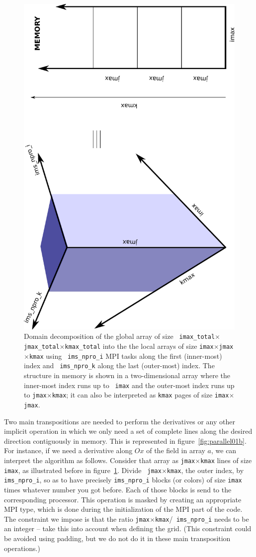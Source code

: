 \begin{figure}[!ht]
\begin{centering}
\includegraphics[height=0.8\textwidth,angle=270]{figs/parallel01a}
\caption{Domain decomposition of the global array of size {\tt
    imax\_total}$\times${\tt jmax\_total}$\times${\tt kmax\_total} into the the
  local arrays of size {\tt imax}$\times${\tt jmax}$\times${\tt kmax} using {\tt
  ims\_npro\_i} MPI tasks along the first (inner-most) index and {\tt
  ims\_npro\_k} along the last (outer-most) index. The structure in memory is
  shown in a two-dimensional array where the inner-most index runs up to {\tt
  imax} and the outer-most index runs up to {\tt jmax}$\times${\tt kmax}; it can
  also be interpreted as {\tt kmax} pages of size {\tt imax}$\times${\tt jmax}.}
\label{fig:parallel01a}
\end{centering}
\end{figure}

Two main transpositions are needed to perform the derivatives or any other
implicit operation in which we only need a set of complete lines along the
desired direction contiguously in memory. This is represented in
figure~\ref{fig:parallel01b}. For instance, if we need a derivative along $Ox$
of the field in array $a$, we can interpret the algorithm as follows. Consider
that array as {\tt jmax}$\times${\tt kmax} lines of size {\tt imax}, as
illustrated before in figure~\ref{fig:parallel01a}. Divide {\tt
jmax}$\times${\tt kmax}, the outer index, by {\tt ims\_npro\_i}, so as to have
precisely {\tt ims\_npro\_i} blocks (or colors) of size {\tt imax} times
whatever number you got before. Each of those blocks is send to the
corresponding processor. This operation is masked by creating an appropriate MPI
type, which is done during the initialization of the MPI part of the code. The
constraint we impose is that the ratio {\tt jmax}$\times${\tt kmax}/{\tt
ims\_npro\_i} needs to be an integer -- take this into account when defining the
grid. (This constraint could be avoided using padding, but we do not do it in
these main transposition operations.)

